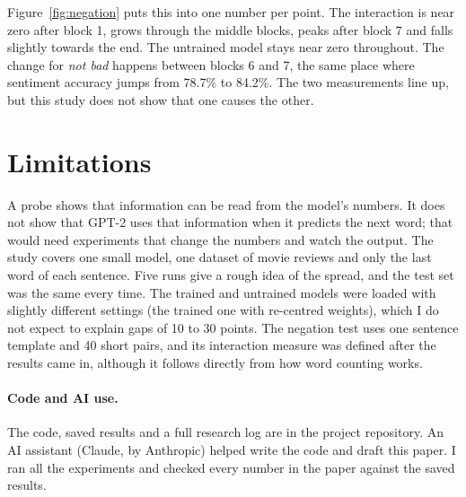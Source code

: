 \documentclass[10pt,twocolumn]{article}
\begin{document}
Figure~\ref{fig:negation} puts this into one number per point. The interaction is near zero after block 1, grows through the middle blocks, peaks after block 7 and falls slightly towards the end. The untrained model stays near zero throughout. The change for \textit{not bad} happens between blocks 6 and 7, the same place where sentiment accuracy jumps from 78.7\% to 84.2\%. The two measurements line up, but this study does not show that one causes the other.

\section{Limitations}
A probe shows that information can be read from the model's numbers. It does not show that GPT-2 uses that information when it predicts the next word; that would need experiments that change the numbers and watch the output. The study covers one small model, one dataset of movie reviews and only the last word of each sentence. Five runs give a rough idea of the spread, and the test set was the same every time. The trained and untrained models were loaded with slightly different settings (the trained one with re-centred weights), which I do not expect to explain gaps of 10 to 30 points. The negation test uses one sentence template and 40 short pairs, and its interaction measure was defined after the results came in, although it follows directly from how word counting works.

\paragraph{Code and AI use.} The code, saved results and a full research log are in the project repository. An AI assistant (Claude, by Anthropic) helped write the code and draft this paper. I ran all the experiments and checked every number in the paper against the saved results.

{\small


}
\end{document}
